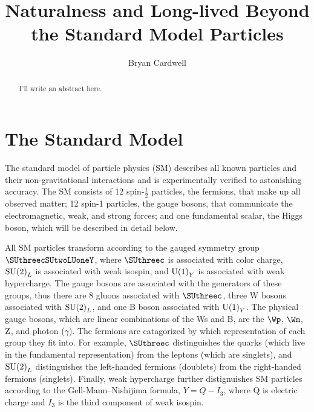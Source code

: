 \documentclass[12pt]{article}
\title{Naturalness and Long-lived Beyond the Standard Model Particles}
\author{Bryan Cardwell}
\begin{document}
\singlespacing
\maketitle

\begin{abstract}

I'll write an abstract here.

\end{abstract}

\newpage
\tableofcontents
\newpage
\doublespacing
{}

\section{The Standard Model}
    The standard model of particle physics (SM) describes all known particles and their non-gravitational interactions and is experimentally verified to astonishing  accuracy. The SM consists of \num{12} spin-$\frac{1}{2}$ particles, the fermions, that make up all observed matter; \num{12} spin-1 particles, the gauge bosons, that communicate the electromagnetic, weak, and strong forces; and one fundamental scalar, the Higgs boson, which will be described in detail below.
    
    All SM particles transform according to the gauged symmetry group $\SUthreecSUtwoLUoneY$, where $\SUthreec$ is associated with color charge, $\mathrm{SU} {\left(2\right)}_L$ is associated with weak isospin, and $\mathrm{U} {\left(1\right)}_Y$ is associated with weak hypercharge. The gauge bosons are associated with the generators of these groups, thus there are \num{8} gluons associated with $\SUthreec$, three W bosons associated with $\mathrm{SU} {\left(2\right)}_L$, and one B boson associated with $\mathrm{U} {\left(1\right)}_Y$. The physical gauge bosons, which are linear combinations of the Ws and B, are the $\Wp$, $\Wm$, $\mathrm{Z}$, and photon ($\gamma$). The fermions are catagorized by which representation of each group they fit into. For example, $\SUthreec$ distinguishes the quarks (which live in the fundamental representation) from the leptons (which are singlets), and $\mathrm{SU} {\left(2\right)}_L$ distinguishes the left-handed fermions (doublets) from the right-handed fermions (singlets). Finally, weak hypercharge further distignuishes SM particles according to the Gell-Mann--Nishijima formula, $Y=Q-I_3$, where Q is electric charge and $I_3$ is the third component of weak isospin.
\end{document}

